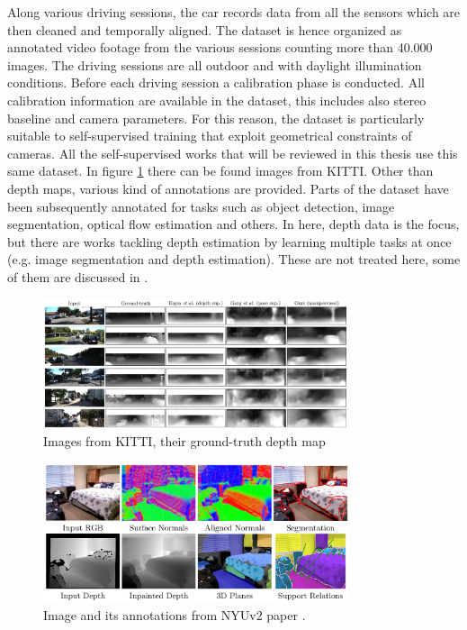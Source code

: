 Along various driving sessions, the car records data from all the sensors which are then cleaned and temporally aligned.
The dataset is hence organized as annotated video footage from the various sessions counting more than 40.000 images.
The driving sessions are all outdoor and with daylight illumination conditions.
Before each driving session a calibration phase is conducted.
All calibration information are available in the dataset, this includes also stereo baseline and camera parameters.
For this reason, the dataset is particularly suitable to self-supervised training that exploit geometrical constraints of cameras.
All the self-supervised works that will be reviewed in this thesis use this same dataset.
In figure \ref{fig:kitti_example} there can be found images from KITTI.
Other than depth maps, various kind of annotations are provided.
Parts of the dataset have been subsequently annotated for tasks such as object detection, image segmentation, optical flow estimation and others.
In here, depth data is the focus, but there are works tackling depth estimation by learning multiple tasks at once (e.g. image segmentation and depth estimation).
These are not treated here, some of them are discussed in \cite{MERTAN2022103441}.

\begin{figure}
	\centering
    \includegraphics[width=0.8\textwidth]{figs/kitti_example}
    \caption{
        Images from KITTI, their ground-truth depth map
        \label{fig:kitti_example}
    }
\end{figure}

\begin{figure}
	\centering
    \includegraphics[width=0.8\textwidth]{figs/nyuv2_example}
    \caption{
        Image and its annotations from NYUv2 paper \cite{NYUv2}.
        \label{fig:nyuv2_example}
    }
\end{figure}

